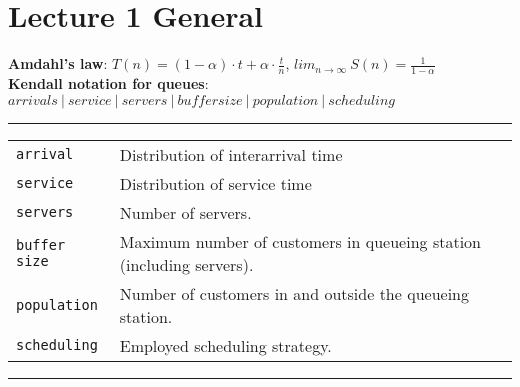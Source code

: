 \section{Lecture 1 General}

\textbf{Amdahl's law}: $T(n) = (1- \alpha) \cdot t + \alpha \cdot \frac{t}{n}$, $lim_{n \rightarrow \infty}\ S(n) = \frac{1}{1 - \alpha}$\\
\textbf{Kendall notation for queues}: $arrivals\ |\ service\ |\ servers\ |\ buffersize\ |\ population\ |\ scheduling$
\newline
\hrule
\newlength{\MyLen}
\begin{tabular}{@{}p{\the\MyLen}@{}p{\linewidth-\the\MyLen}@{}}
\verb!arrival!			&	Distribution of interarrival time\\
\verb!service!			&	Distribution of service time\\
\verb!servers!			&	Number of servers. \\
\verb!buffer size!		&	Maximum number of customers in queueing station (including servers). \\
\verb!population!		&	Number of customers in and outside the queueing station. \\
\verb!scheduling!		&	Employed scheduling strategy. \\
\end{tabular}
\newline
\hrule